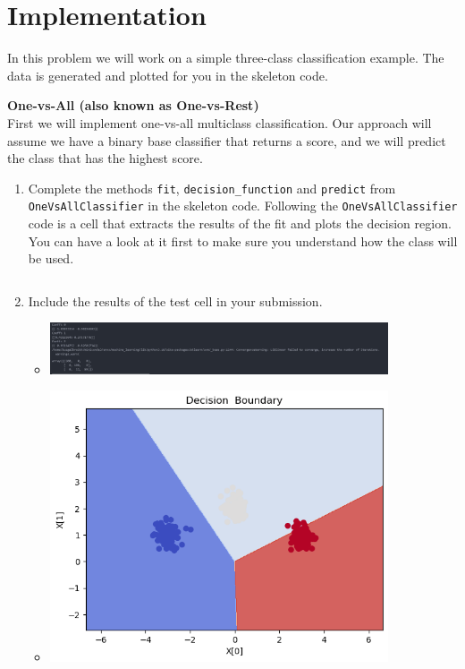 \documentclass{article}
\newcommand{\nyuparagraph}[1]{\vspace{0.3cm}\textcolor{nyupurple}{\bf \large #1}\\}
\theoremstyle{plain}
\theoremstyle{definition}
\begin{document}
\section{Implementation}

In this problem we will work on a simple three-class classification
example.
The data is generated and plotted for you in the skeleton code. 

\nyuparagraph{One-vs-All (also known as One-vs-Rest)}

First we will implement one-vs-all multiclass classification.
Our approach will assume we have a binary base classifier that returns
a score, and we will predict the class that has the highest score. 
\begin{enumerate}
  \setcounter{enumi}{\value{saveenum}}
\item Complete the methods \texttt{fit}, \texttt{decision\_function} and \texttt{predict} from \texttt{OneVsAllClassifier}  in the skeleton code. Following
the \texttt{OneVsAllClassifier} code is a cell that extracts the results of
the fit and plots the decision region. You can have a look at it first to make sure you understand how the class will be used.
\begin{itemize}
    \color{blue}
           \inputminted[firstline=43, lastline=103, breaklines=True]{python}{hw_5.py}
\end{itemize}

\item  Include the results of the test cell in your submission.
\begin{itemize}
    \color{blue}
    \item 

\includegraphics[width=10cm]{homework/homework_5/immages/q1_1.jpg}\item 
\includegraphics[width=10cm]{homework/homework_5/immages/q1_2.png}
\end{itemize}
\setcounter{saveenum}{\value{enumi}}
\end{enumerate}
\end{document}
